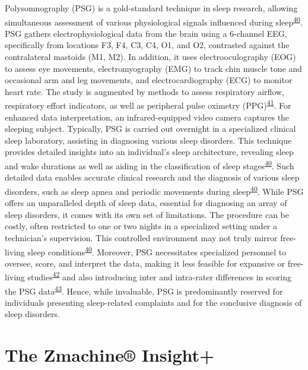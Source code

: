 \documentclass[
  10pt,
]{scrbook}
\begin{document}
Polysomnography (PSG) is a gold-standard technique in sleep research,
allowing simultaneous assessment of various physiological signals
influenced during
sleep\textsuperscript{\protect\hyperlink{ref-sadeh_2015}{40}}. PSG
gathers electrophysiological data from the brain using a 6-channel EEG,
specifically from locations F3, F4, C3, C4, O1, and O2, contrasted
against the contralateral mastoids (M1, M2). In addition, it uses
electrooculography (EOG) to assess eye movements, electromyography (EMG)
to track chin muscle tone and occasional arm and leg movements, and
electrocardiography (ECG) to monitor heart rate. The study is augmented
by methods to assess respiratory airflow, respiratory effort indicators,
as well as peripheral pulse oximetry
(PPG)\textsuperscript{\protect\hyperlink{ref-ibuxe1uxf1ez_2018}{41}}.
For enhanced data interpretation, an infrared-equipped video camera
captures the sleeping subject. Typically, PSG is carried out overnight
in a specialized clinical sleep laboratory, assisting in diagnosing
various sleep disorders. This technique provides detailed insights into
an individual's sleep architecture, revealing sleep and wake durations
as well as aiding in the classification of sleep
stages\textsuperscript{\protect\hyperlink{ref-sadeh_2015}{40}}. Such
detailed data enables accurate clinical research and the diagnosis of
various sleep disorders, such as sleep apnea and periodic movements
during sleep\textsuperscript{\protect\hyperlink{ref-sadeh_2015}{40}}.
While PSG offers an unparalleled depth of sleep data, essential for
diagnosing an array of sleep disorders, it comes with its own set of
limitations. The procedure can be costly, often restricted to one or two
nights in a specialized setting under a technician's supervision. This
controlled environment may not truly mirror free-living sleep
conditions\textsuperscript{\protect\hyperlink{ref-sadeh_2015}{40}}.
Moreover, PSG necessitates specialized personnel to oversee, score, and
interpret the data, making it less feasible for expansive or free-living
studies\textsuperscript{\protect\hyperlink{ref-girschik_validation_2012}{42}}
and also introducing inter and intra-rater differences in scoring the
PSG data\textsuperscript{\protect\hyperlink{ref-levendowski_2017}{43}}.
Hence, while invaluable, PSG is predominantly reserved for individuals
presenting sleep-related complaints and for the conclusive diagnosis of
sleep disorders.

\hypertarget{the-zmachine-insight}{%
\section{The Zmachine® Insight+}\label{the-zmachine-insight}}
\end{document}
